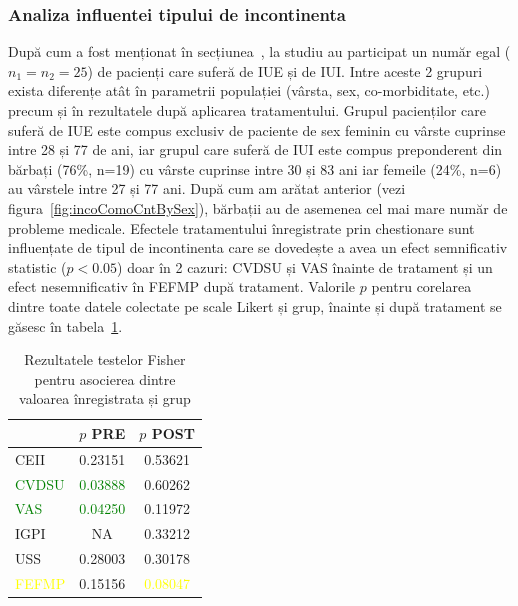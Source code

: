 \documentclass[12pt]{article}
\begin{document}
\subsubsection{Analiza influentei tipului de incontinenta}
 După cum a fost menționat în secțiunea~, la studiu au participat un număr egal ($n_1=n_2=25$) de pacienți care suferă de \ac{IUE} și de \ac{IUI}. Intre aceste 2 grupuri exista diferențe atât în parametrii populației (vârsta, sex, co-morbiditate, etc.) precum și în rezultatele după aplicarea tratamentului. Grupul pacienților care suferă de \ac{IUE} este compus exclusiv de paciente de sex feminin cu vârste cuprinse intre 28 și 77 de ani, iar grupul care suferă de \ac{IUI} este compus preponderent din bărbați (76\%, n=19) cu vârste cuprinse intre 30 și 83 ani iar femeile (24\%, n=6) au vârstele intre 27 și 77 ani. După cum am arătat anterior (vezi figura~\ref{fig:incoComoCntBySex}), bărbații au de asemenea cel mai mare număr de probleme medicale.
Efectele tratamentului înregistrate prin chestionare sunt influențate de tipul de incontinenta care se dovedește a avea un efect semnificativ statistic ($p<0.05$) doar în 2 cazuri: \ac{CVDSU} și \ac{VAS} înainte de tratament și un efect nesemnificativ în \ac{FEFMP} după tratament. Valorile $p$ pentru corelarea dintre toate datele colectate pe scale Likert și grup, înainte și după tratament se găsesc în tabela~\ref{tab:resFisherGroup}. 
 \begin{table}[H]
	\centering
	\begin{tabular}{|l|c|c|} \hline
	   																	& $p$ PRE 													& $p$ POST \\ \hline
		CEII 														& 0.23151 													& 0.53621 \\ \hline
		\textcolor{green}{CVDSU} 	& \textcolor{green}{0.03888} 	& 0.60262 \\ \hline
		\textcolor{green}{VAS} 			& \textcolor{green}{0.04250} 	& 0.11972 \\ \hline
		IGPI 														& NA 																&  0.33212 \\ \hline
		USS 															& 0.28003 													& 0.30178 \\ \hline
		\textcolor{yellow}{FEFMP} 	& 0.15156 													& \textcolor{yellow}{0.08047} \\ \hline
	\end{tabular}
	\caption{Rezultatele testelor Fisher pentru asocierea dintre valoarea înregistrata și grup} 
	\label{tab:resFisherGroup}
\end{table}
%
\end{document}
